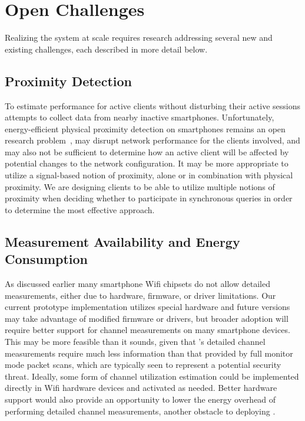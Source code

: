 \section{Open Challenges}
\label{sec-challenges}

Realizing the \PS{} system at scale requires research addressing several new
and existing challenges, each described in more detail below.

\subsection{Proximity Detection}

To estimate performance for active clients without disturbing their active
sessions \PS{} attempts to collect data from nearby inactive smartphones.
Unfortunately, energy-efficient physical proximity detection on smartphones
remains an open research problem~\cite{searchlight-mobicom12}, may disrupt
network performance for the clients involved, and may also not be sufficient
to determine how an active client will be affected by potential changes to
the network configuration. It may be more appropriate to utilize a
signal-based notion of proximity, alone or in combination with physical
proximity. We are designing \PS{} clients to be able to utilize multiple
notions of proximity when deciding whether to participate in synchronous
queries in order to determine the most effective approach.

\subsection{Measurement Availability and Energy Consumption}

As discussed earlier many smartphone Wifi chipsets do not allow detailed
measurements, either due to hardware, firmware, or driver limitations. Our
current prototype \PS{} implementation utilizes special hardware and future
versions may take advantage of modified firmware or drivers, but broader
adoption will require better support for channel measurements on many
smartphone devices. This may be more feasible than it sounds, given that
\PS{}'s detailed channel measurements require much less information than that
provided by full monitor mode packet scans, which are typically seen to
represent a potential security threat. Ideally, some form of channel
utilization estimation could be implemented directly in Wifi hardware devices
and activated as needed. Better hardware support would also provide an
opportunity to lower the energy overhead of performing detailed channel
measurements, another obstacle to deploying \PS{}.

